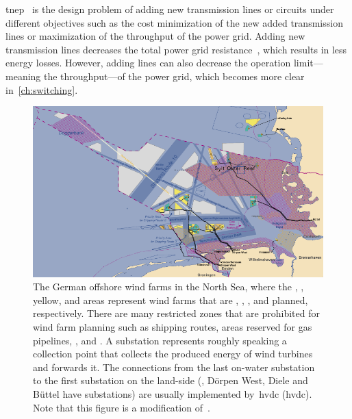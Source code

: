\gls{tnep}~\parencite{Hem13} is the design problem of adding new 
transmission lines or circuits under different objectives such as the cost
minimization of the new added transmission lines or maximization of the
throughput of the power grid. Adding new transmission lines decreases the total
power grid resistance~\parencite{Cof14a}, which results in less energy losses.
However, adding lines can also decrease the operation limit---meaning the
throughput---of the power grid, which becomes more clear in~\cref{ch:switching}.
% 
\begin{figure}[t!]
    \includegraphics{windfarmplacement/figures/NorthSeaWindFarms.pdf}
    \caption[The offshore wind farms of the German Bight in the north sea.]{   
        The German offshore wind farms in the North Sea, where the
        , , 
        {yellow}, and  areas represent wind farms that
        are , , , and 
        {planned}, respectively. There are many restricted zones that are
        prohibited for wind farm planning such as shipping routes, areas
        reserved for gas pipelines, , and .
        A substation represents roughly speaking a collection point that
        collects the produced energy of wind turbines and forwards it. The
        connections from the last on-water substation to the first substation on
        the land-side (\eg, D{\"o}rpen West, Diele and B{\"u}ttel have
        substations) are usually implemented by~\acrlong{hvdc} (\gls{hvdc}).
        Note that this figure is a modification
        of~\parencite{online:offshore-wind-farm:german-bight}. }%
    \label{ch:intro:fig:north-sea-wind-farms}
\end{figure}
% 

